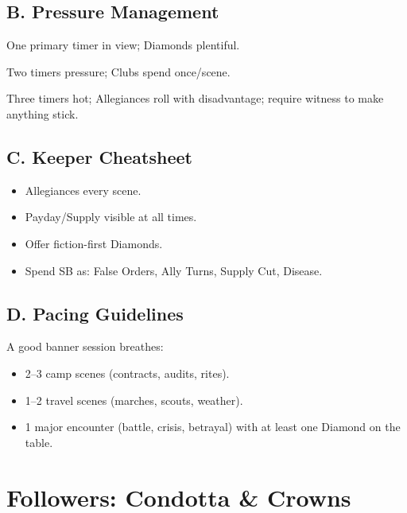 \documentclass[11pt]{article}
\begin{document}
\subsection*{B. Pressure Management}

\begin{description}[leftmargin=*,labelwidth=2cm]
\item[Low:] One primary timer in view; Diamonds plentiful.
\item[Medium:] Two timers pressure; Clubs spend once/scene.
\item[High:] Three timers hot; Allegiances roll with disadvantage; require witness to make anything stick.
\end{description}

\subsection*{C. Keeper Cheatsheet}

\begin{itemize}
    \item Allegiances every scene.
    \item Payday/Supply visible at all times.
    \item Offer fiction-first Diamonds.
    \item Spend SB as: False Orders, Ally Turns, Supply Cut, Disease.
\end{itemize}

\subsection*{D. Pacing Guidelines}

A good banner session breathes:
\begin{itemize}
    \item 2--3 camp scenes (contracts, audits, rites).
    \item 1--2 travel scenes (marches, scouts, weather).
    \item 1 major encounter (battle, crisis, betrayal) with at least one Diamond on the table.
\end{itemize}



\section{Followers: Condotta \& Crowns}
\label{sec:banners-followers-cap}
\end{document}
